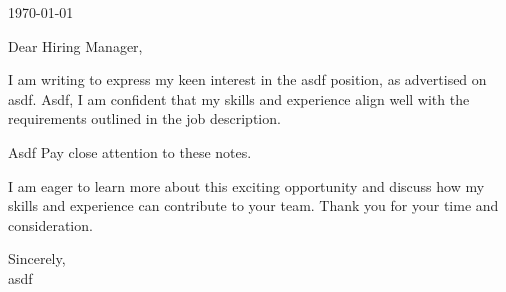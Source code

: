 \documentclass[letterpaper,11pt]{article}
\begin{document}
\today \\
\vspace{20pt}

Dear Hiring Manager, \\
\vspace{10pt}

I am writing to express my keen interest in the asdf position, as advertised on asdf. Asdf, I am confident that my skills and experience align well with the requirements outlined in the job description.
\vspace{10pt}

Asdf Pay close attention to these notes.
\vspace{10pt}


\vspace{10pt}

I am eager to learn more about this exciting opportunity and discuss how my skills and experience can contribute to your team. Thank you for your time and consideration.
\vspace{20pt}

Sincerely, \\
\vspace{40pt} %
asdf

\end{document}
